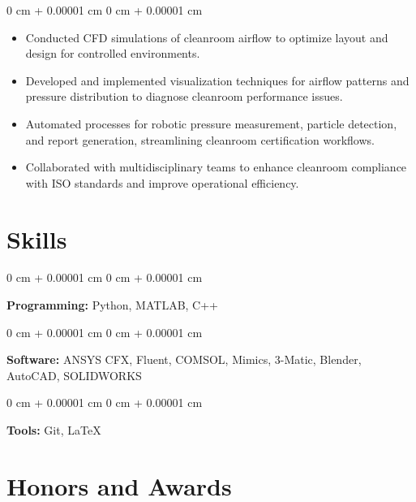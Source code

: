 \documentclass[10pt, letterpaper]{article}
\newenvironment{highlights}{
    \begin{itemize}[
        topsep=0.10 cm,
        parsep=0.10 cm,
        partopsep=0pt,
        itemsep=0pt,
        leftmargin=0 cm + 10pt
    ]
}{
    \end{itemize}
} %
\newenvironment{onecolentry}{
    \begin{adjustwidth}{
        0 cm + 0.00001 cm
    }{
        0 cm + 0.00001 cm
    }
}{
    \end{adjustwidth}
} %
\begin{document}
        \vspace{0.10 cm}
        \begin{onecolentry}
            \begin{highlights}
                \item Conducted CFD simulations of cleanroom airflow to optimize layout and design for controlled environments.
                \item Developed and implemented visualization techniques for airflow patterns and pressure distribution to diagnose cleanroom performance issues.
                \item Automated processes for robotic pressure measurement, particle detection, and report generation, streamlining cleanroom certification workflows.
                \item Collaborated with multidisciplinary teams to enhance cleanroom compliance with ISO standards and improve operational efficiency.
            \end{highlights}
        \end{onecolentry}

        \vspace{0.2 cm}

    \section{Skills}

    \begin{onecolentry}
        \textbf{Programming:} Python, MATLAB, C++ 
    \end{onecolentry}

    \vspace{0.2 cm}

    \begin{onecolentry}
        \textbf{Software:} ANSYS CFX, Fluent, COMSOL, Mimics, 3-Matic, Blender, AutoCAD, SOLIDWORKS 
    \end{onecolentry}

    \vspace{0.2 cm}

    \begin{onecolentry}
        \textbf{Tools:} Git, \LaTeX 
    \end{onecolentry}


    \section{Honors and Awards}
\end{document}
